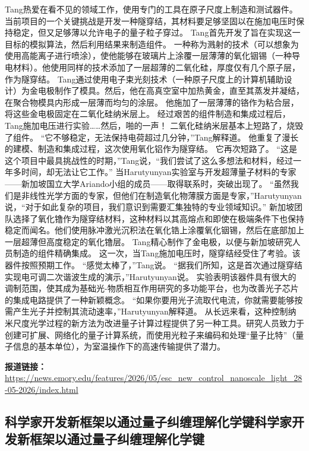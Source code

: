 \documentclass[12pt,a4paper]{ctexart}
\begin{document}
Tang热爱在看不见的领域工作，使用专门的工具在原子尺度上制造和测试器件。
当前项目的一个关键挑战是开发一种隧穿结，其材料要足够坚固以在施加电压时保持稳定，但又足够薄以允许电子的量子粒子穿过。
Tang首先开发了旨在实现这一目标的模拟算法，然后利用结果来制造组件。
一种称为溅射的技术（可以想象为使用高能离子进行喷涂），使他能够在玻璃片上涂覆一层薄薄的氧化铟锡（一种导电材料）。他使用同样的技术添加了一层超薄的二氧化硅，厚度仅有几个原子层，作为隧穿结。
Tang通过使用电子束光刻技术（一种原子尺度上的计算机辅助设计）为金电极制作了模具。然后，他在高真空室中加热黄金，直至其蒸发并凝结，在聚合物模具内形成一层薄而均匀的涂层。
他施加了一层薄薄的铬作为粘合层，将这些金电极固定在二氧化硅纳米层上。
经过艰苦的组件制造和集成过程后，Tang施加电压进行实验……然后，啪的一声！
二氧化硅纳米层基本上短路了，烧毁了组件。
“它不够稳定，无法保持电荷超过几分钟，”Tang解释道。
他重复了漫长的建模、制造和集成过程，这次使用氧化铝作为隧穿结。
它再次短路了。
“这是这个项目中最具挑战性的时期，”Tang说，“我们尝试了这么多想法和材料，经过一年多时间，却无法让它工作。”
当Harutyunyan实验室与开发超薄量子材料的专家——新加坡国立大学Ariando小组的成员——取得联系时，突破出现了。
“虽然我们是非线性光学方面的专家，但他们在制造氧化物薄膜方面是专家，”Harutyunyan说，“对于如此复杂的项目，我们意识到需要汇集独特的专业领域知识。”
新加坡团队选择了氧化镥作为隧穿结材料，这种材料以其高熔点和即使在极端条件下也保持稳定而闻名。他们使用脉冲激光沉积法在氧化锆上涂覆氧化铟锡，然后在底部加上一层超薄但高度稳定的氧化镥层。
Tang精心制作了金电极，以便与新加坡研究人员制造的组件精确集成。
这一次，当Tang施加电压时，隧穿结经受住了考验。该器件按照预期工作。
“感觉太棒了，”Tang说。
“据我们所知，这是首次通过隧穿结实现电可调二次谐波生成的演示，”Harutyunyan说。
实验表明该器件具有很大的调制范围，使其成为基础光-物质相互作用研究的多功能平台，也为改善光子芯片的集成电路提供了一种新颖概念。
“如果你要用光子流取代电流，你就需要能够按需产生光子并控制其流动速率，”Harutyunyan解释道。
从长远来看，这种控制纳米尺度光学过程的新方法为改进量子计算过程提供了另一种工具。研究人员致力于创建可扩展、网络化的量子计算系统，而使用光粒子来编码和处理“量子比特”（量子信息的基本单位），为室温操作下的高速传输提供了潜力。

\noindent\textbf{报道链接：}\url{https://news.emory.edu/features/2026/05/esc\_new\_control\_nanoscale\_light\_28-05-2026/index.html}

\subsection{ 科学家开发新框架以通过量子纠缠理解化学键科学家开发新框架以通过量子纠缠理解化学键 }
\end{document}
